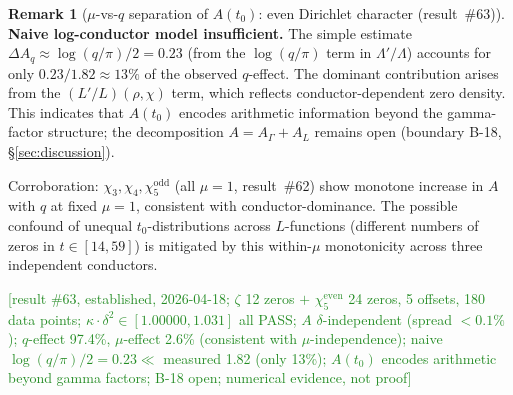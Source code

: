 \documentclass[11pt, a4paper]{article}
\theoremstyle{definition}
\newtheorem{remark}{Remark}[section]
\theoremstyle{plain}
\begin{document}
\begin{remark}[$\mu$-vs-$q$ separation of $A(t_0)$: even Dirichlet character (result~\#63)]
\noindent\textbf{Naive log-conductor model insufficient.}
The simple estimate $\Delta A_q \approx \log(q/\pi)/2 = 0.23$ (from the
$\log(q/\pi)$ term in $\Lambda'/\Lambda$) accounts for only
$0.23/1.82 \approx 13\%$ of the observed $q$-effect.
The dominant contribution arises from the $(L'/L)(\rho,\chi)$ term,
which reflects conductor-dependent zero density.
This indicates that $A(t_0)$ encodes arithmetic information beyond the
gamma-factor structure; the decomposition $A = A_\Gamma + A_L$ remains open
(boundary B-18, \S\ref{sec:discussion}).

\noindent Corroboration: $\chi_3, \chi_4, \chi_5^{\mathrm{odd}}$ (all $\mu = 1$, result~\#62)
show monotone increase in $A$ with $q$ at fixed $\mu = 1$,
consistent with conductor-dominance.
The possible confound of unequal $t_0$-distributions across $L$-functions
(different numbers of zeros in $t \in [14, 59]$) is mitigated by
this within-$\mu$ monotonicity across three independent conductors.

\textcolor{ForestGreen}{[result \#63, established, 2026-04-18;
$\zeta$ 12 zeros $+$ $\chi_5^{\mathrm{even}}$ 24 zeros, 5 offsets, 180 data points;
$\kappa{\cdot}\delta^2{\in}[1.00000,1.031]$ all PASS;
$A$ $\delta$-independent (spread ${<}0.1\%$);
$q$-effect 97.4\%, $\mu$-effect 2.6\% (consistent with $\mu$-independence);
naive $\log(q/\pi)/2 = 0.23 \ll$ measured 1.82 (only 13\%);
$A(t_0)$ encodes arithmetic beyond gamma factors; B-18 open;
numerical evidence, not proof]}
\end{remark}
\end{document}
